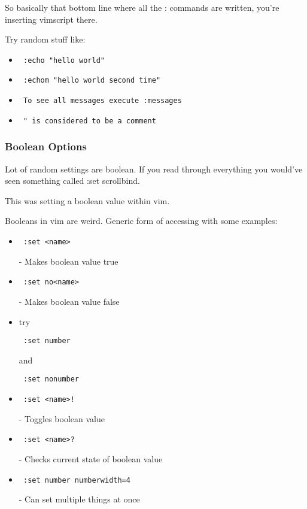 \documentclass[12pt, letterpaper]{article}
\begin{document}
So basically that bottom line where all the : commands are written, you're inserting vimscript there.

Try random stuff like: 
\begin{itemize}
    \item \begin{verbatim} :echo "hello world" \end{verbatim}
    \item \begin{verbatim} :echom "hello world second time" \end{verbatim}
    \item \begin{verbatim} To see all messages execute :messages \end{verbatim}
    \item \begin{verbatim} " is considered to be a comment \end{verbatim}
\end{itemize}

\subsubsection{Boolean Options}

Lot of random settings are boolean. If you read through everything you would've seen something called :set scrollbind.

This was setting a boolean value within vim.

Booleans in vim are weird.
Generic form of accessing with some examples:
\begin{itemize}
    \item \begin{verbatim} :set <name> \end{verbatim}- Makes boolean value true 
    \item \begin{verbatim} :set no<name> \end{verbatim}- Makes boolean value false 
    \item try \begin{verbatim} :set number \end{verbatim} and \begin{verbatim} :set nonumber \end{verbatim}
    \item \begin{verbatim} :set <name>! \end{verbatim}- Toggles boolean value 
    \item \begin{verbatim} :set <name>? \end{verbatim}- Checks current state of boolean value 
    \item \begin{verbatim} :set number numberwidth=4 \end{verbatim}- Can set multiple things at once 
\end{itemize}
\end{document}
